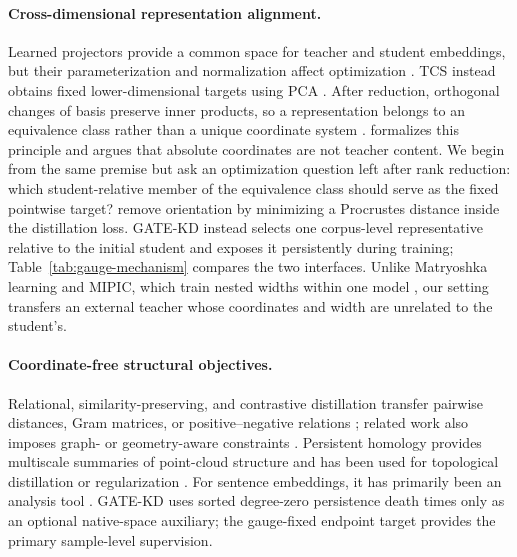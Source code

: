 \paragraph{Cross-dimensional representation alignment.}
Learned projectors provide a common space for teacher and student embeddings,
but their parameterization and normalization affect optimization
\citep{hpd,miles2024projector,chen2023projector}. TCS instead obtains fixed
lower-dimensional targets using PCA \citep{tcs}. After reduction, orthogonal
changes of basis preserve inner products, so a representation belongs to an
equivalence class rather than a unique coordinate system
\citep{kornblith2019cka,williams2021shape,maystre2025procrustes}.
\citet{han2026equivalence} formalizes this principle and argues that absolute
coordinates are not teacher content. We begin from the same premise but ask an
optimization question left after rank reduction: which student-relative member
of the equivalence class should serve as the fixed pointwise target?
\citet{bhattarai2025shortcut} remove orientation by minimizing a Procrustes
distance inside the distillation loss. GATE-KD instead selects one corpus-level
representative relative to the initial student and exposes it persistently
during training; Table~\ref{tab:gauge-mechanism} compares the two interfaces.
Unlike Matryoshka learning and MIPIC, which train nested widths within one model
\citep{kusupati2022mrl,huy2026mipic}, our setting transfers an external teacher
whose coordinates and width are unrelated to the student's.

\paragraph{Coordinate-free structural objectives.}
Relational, similarity-preserving, and contrastive distillation transfer
pairwise distances, Gram matrices, or positive--negative relations
\citep{park2019rkd,tung2019similarity,tian2020crd}; related work also imposes
graph- or geometry-aware constraints
\citep{joshi2024representation,burykina2025jdcemb,zhou2026dice}. Persistent
homology provides multiscale summaries of point-cloud structure and has been
used for topological distillation or regularization
\citep{topkd2024,jeon2024topological,heiter2023topological}. For sentence
embeddings, it has primarily been an analysis tool
\citep{das2021tedtalk}. GATE-KD uses sorted degree-zero persistence death times
only as an optional native-space auxiliary; the gauge-fixed endpoint target
provides the primary sample-level supervision.
